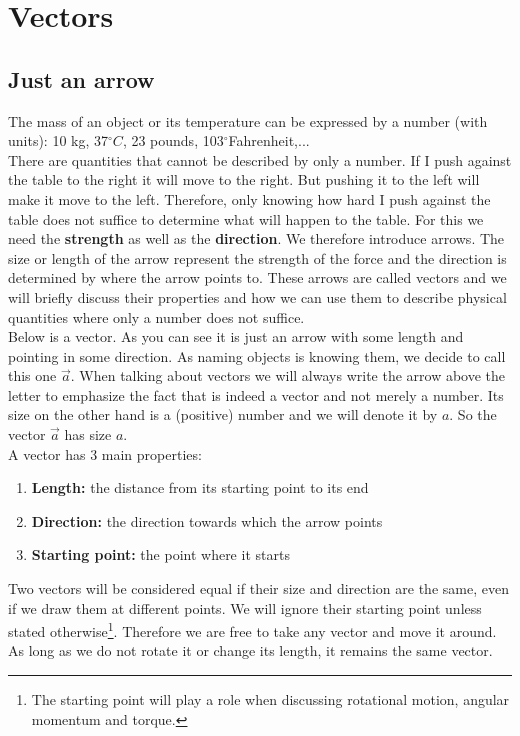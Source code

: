 \chapter{Vectors}
\label{Vector_Chapter}

\section{Just an arrow}

\noindent The mass of an object or its temperature can be expressed by a number (with units): 10 kg, 37$^{\circ}C$, 23 pounds, 103$^{\circ}$Fahrenheit,...\\

\noindent There are quantities that cannot be described by only a number. If I push against the table to the right it will move to the right. But pushing it to the left will make it move to the left. Therefore, only knowing how hard I push against the table does not suffice to determine what will happen to the table. For this we need the \textbf{strength} as well as the \textbf{direction}. We therefore introduce arrows. The size or length of the arrow represent the strength of the force and the direction is determined by where the arrow points to. These arrows are called vectors and we will briefly discuss their properties and how we can use them to describe physical quantities where only a number does not suffice.\\

\noindent Below is a vector. As you can see it is just an arrow with some length and pointing in some direction. As naming objects is knowing them, we decide to call this one $\vec{a}$. When talking about vectors we will always write the arrow above the letter to emphasize the fact that is indeed a vector and not merely a number. Its size on the other hand is a (positive) number and we will denote it by $a$. So the vector $\vec{a}$ has size $a$.\\

\noindent A vector has 3 main properties:
\begin{enumerate}[a]
\item \textbf{Length: }the distance from its starting point to its end
\item \textbf{Direction: }the direction towards which the arrow points
\item \textbf{Starting point: }the point where it starts
\end{enumerate}
Two vectors will be considered equal if their size and direction are the same, even if we draw them at different points. We will ignore their starting point unless stated otherwise\footnote{The starting point will play a role when discussing rotational motion, angular momentum and torque.}. Therefore we are free to take any vector and move it around. As long as we do not rotate it or change its length, it remains the same vector.

